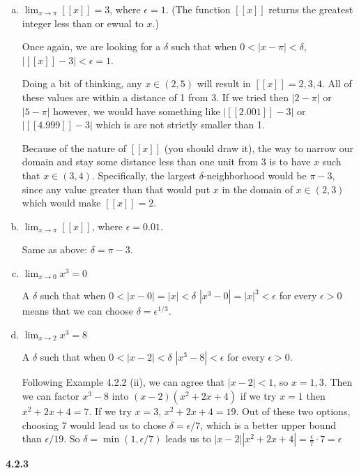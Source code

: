 \begin{enumerate}[(a)]
\item $\lim_{x\rightarrow \pi} [[x]] = 3$, where $\epsilon = 1$.
(The function $[[x]]$ returns the greatest integer less than or ewual to $x$.)

Once again, we are looking for a $\delta$ such that when $0 < |x- \pi| < \delta$, $|[[x]] - 3| < \epsilon = 1$.

Doing a bit of thinking, any $x \in (2,5)$ will result in $[[x]] = 2, 3, 4$.
All of these values are within a distance of 1 from 3.
If we tried then $|2-\pi|$ or $|5-\pi|$ however, we would have something like $|[[2.001]]-3|$ or $|[[4.999]]-3|$
which is are not strictly smaller than 1.

Because of the nature of $[[x]]$ (you should draw it), the way to narrow our domain and stay some distance less than one unit
from $3$ is to have $x$ such that $x\in (3,4)$.
Specifically, the largest $\delta$-neighborhood would be $\pi - 3$, since any value greater than that would put $x$ in the domain of
$x\in (2,3)$ which would make $[[x]]=2$.

\item $\lim_{x\rightarrow \pi} [[x]]$, where $\epsilon = 0.01$.

Same as above: $\delta = \pi - 3$.

\item $\lim_{x\rightarrow 0} x^3 = 0$

A $\delta$ such that when $0 < |x-0| = |x| < \delta$ $|x^3 - 0| = |x|^3 < \epsilon$ for every $\epsilon > 0$
means that we can choose $\delta = \epsilon^{1/3}$.

\item $\lim_{x\rightarrow 2} x^3 = 8$

A $\delta$ such that when $0 < |x-2| < \delta$ $|x^3 - 8| < \epsilon$ for every $\epsilon > 0$.

Following Example 4.2.2 (ii), we can agree that $|x-2|<1$, so $x=1,3$.
Then we can factor $x^3 -8$ into $(x-2)(x^2 + 2x + 4)$ if we try $x=1$ then $x^2 + 2x + 4 = 7$.
If we try $x=3$, $x^2 + 2x + 4 = 19$.
Out of these two options, choosing 7 would lead us to chose $\delta = \epsilon /7$, which is a better upper bound than $\epsilon / 19$.
So $\delta = \min(1, \epsilon/7)$ leads us to $|x-2| |x^2 +2x + 4| = \frac{\epsilon}{7} \cdot 7 = \epsilon$

\end{enumerate}



\textbf{4.2.3}
\\

